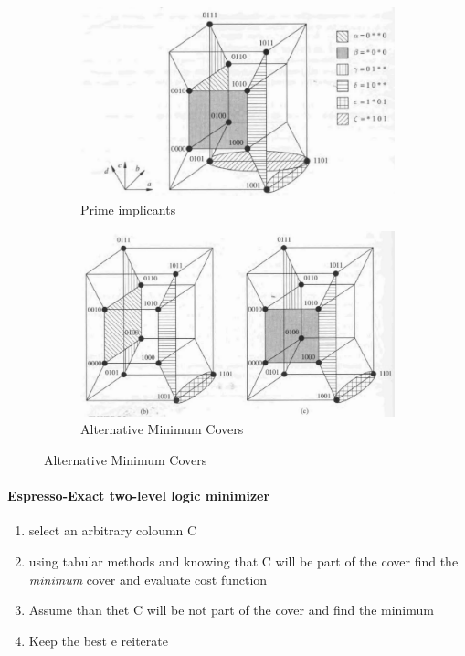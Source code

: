 \begin{figure}[H]
	\centering
	\begin{subfigure}[b]{0.7\textwidth}
		\includegraphics[width=\textwidth]{./Cap6/Images/Image4.png}
		\caption{Prime implicants}
		\label{fig:primeImpl}
	\end{subfigure}
	\quad
	\begin{subfigure}[b]{0.7\textwidth}
		\includegraphics[width=\textwidth]{./Cap6/Images/Image5.png}
		\caption{Alternative Minimum Covers}
		\label{fig:altminim}
	\end{subfigure}
\end{figure}
\paragraph{Espresso-Exact two-level logic minimizer}
\begin{enumerate}
	\item select an arbitrary coloumn C
	\item using tabular methods and knowing that C will be part of the cover find the \textit{minimum} cover and evaluate cost function
	\item Assume than thet C will be not part of the cover and find the minimum
	\item Keep the best e reiterate
\end{enumerate}

